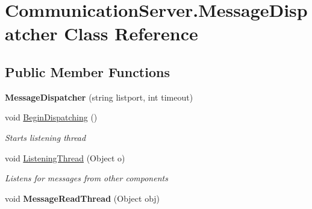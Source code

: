 \hypertarget{class_communication_server_1_1_message_dispatcher}{}\section{Communication\+Server.\+Message\+Dispatcher Class Reference}
\label{class_communication_server_1_1_message_dispatcher}
\subsection*{Public Member Functions}
\begin{DoxyCompactItemize}
\item 
\hypertarget{class_communication_server_1_1_message_dispatcher_a4b2daf0a094e8477712b1fce3f6051f3}{}{\bfseries Message\+Dispatcher} (string listport, int timeout)\label{class_communication_server_1_1_message_dispatcher_a4b2daf0a094e8477712b1fce3f6051f3}

\item 
void \hyperlink{class_communication_server_1_1_message_dispatcher_ab853c64f7c38ee8b4afbd0f02dbf4c49}{Begin\+Dispatching} ()
\begin{DoxyCompactList}\small\item\em Starts listening thread \end{DoxyCompactList}\item 
void \hyperlink{class_communication_server_1_1_message_dispatcher_a638aa74e23ab23176a4e23890e6beeb4}{Listening\+Thread} (Object o)
\begin{DoxyCompactList}\small\item\em Listens for messages from other components \end{DoxyCompactList}\item 
\hypertarget{class_communication_server_1_1_message_dispatcher_a1b3d608182a9dc9a5c4faaced34bc104}{}void {\bfseries Message\+Read\+Thread} (Object obj)\label{class_communication_server_1_1_message_dispatcher_a1b3d608182a9dc9a5c4faaced34bc104}


\end{DoxyCompactItemize}
